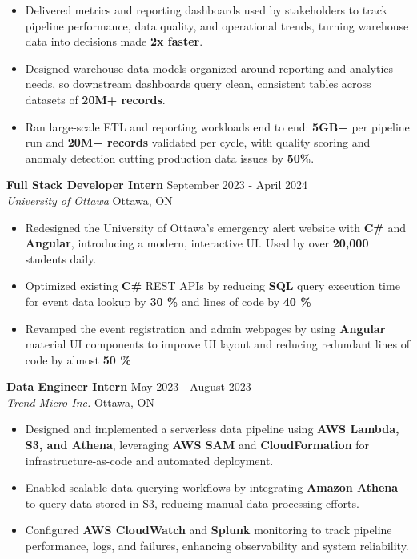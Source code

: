 \documentclass[a4paper]{article}
\begin{document}
\begin{itemize}
\item Delivered metrics and reporting dashboards used by stakeholders to track pipeline performance, data quality, and operational trends, turning warehouse data into decisions made \textbf{2x faster}.

\item Designed warehouse data models organized around reporting and analytics needs, so downstream dashboards query clean, consistent tables across datasets of \textbf{20M+ records}.

\item Ran large-scale ETL and reporting workloads end to end: \textbf{5GB+} per pipeline run and \textbf{20M+ records} validated per cycle, with quality scoring and anomaly detection cutting production data issues by \textbf{50\%}.

\end{itemize}

\textbf{Full Stack Developer Intern } \hfill September 2023 - April 2024\\
\textit{University of Ottawa} \hfill Ottawa, ON\\
\vspace{-2mm}
\begin{itemize} \itemsep -4pt \topsep 0pt
    \item Redesigned the University of Ottawa's emergency alert website with \textbf{C\#} and \textbf{Angular}, introducing a modern, interactive UI. Used by over \textbf{20,000} students daily.
     \item Optimized existing \textbf{C\#} REST APIs by reducing \textbf{SQL} query execution time for event data lookup by \textbf{30 \%} and lines of code by \textbf{40 \%}
    \item Revamped the event registration and admin webpages by using \textbf{Angular} material UI components to improve UI layout and reducing redundant lines of code by almost \textbf{50 \%}
\end{itemize}

\textbf{Data Engineer Intern} \hfill May 2023 - August 2023\\
\textit{Trend Micro Inc.} \hfill Ottawa, ON\\
\vspace{-2mm}
\begin{itemize} \itemsep -4pt \topsep 0pt

\item Designed and implemented a serverless data pipeline using \textbf{AWS Lambda, S3, and Athena}, leveraging \textbf{AWS SAM} and \textbf{CloudFormation} for infrastructure-as-code and automated deployment.

\item Enabled scalable data querying workflows by integrating \textbf{Amazon Athena} to query data stored in S3, reducing manual data processing efforts.

\item Configured \textbf{AWS CloudWatch} and \textbf{Splunk} monitoring to track pipeline performance, logs, and failures, enhancing observability and system reliability.

\end{itemize}
\end{document}
